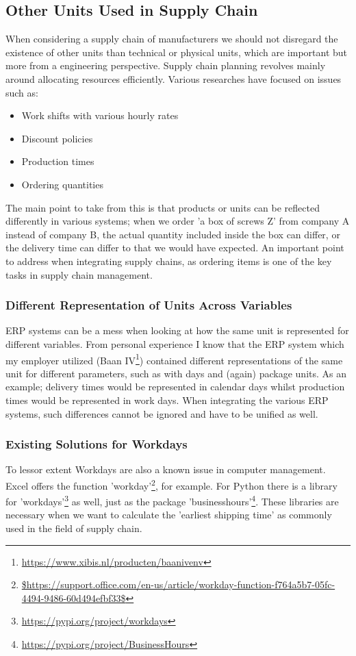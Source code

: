 \documentclass[sigchi, nonacm]{acmart}
\begin{document}
\subsection{Other Units Used in Supply Chain}
When considering a supply chain of manufacturers we should not disregard the existence of other units than technical or physical units, which are important but more from a engineering perspective. Supply chain planning revolves mainly around allocating resources efficiently. Various researches \cite{graves1998dynamic}\cite{sarkar2016supply} have focused on issues such as:
\begin{itemize}
    \item{Work shifts with various hourly rates}
    \item{Discount policies}
    \item{Production times}
    \item{Ordering quantities}
\end{itemize}

The main point to take from this is that products or units can be reflected differently in various systems; when we order 'a box of screws Z' from company A instead of company B, the actual quantity included inside the box can differ, or the delivery time can differ to that we would have expected. An important point to address when integrating supply chains, as ordering items is one of the key tasks in supply chain management.

\subsubsection{Different Representation of Units Across Variables}
ERP systems can be a mess when looking at how the same unit is represented for different variables. From personal experience I know that the ERP system which my employer utilized (Baan IV\footnote{\raggedright\url{https://www.xibis.nl/producten/baanivenv}}) contained different representations of the same unit for different parameters, such as with days and (again) package units. As an example; delivery times would be represented in calendar days whilst production times would be represented in work days. When integrating the various ERP systems, such differences cannot be ignored and have to be unified as well.

\subsubsection{Existing Solutions for Workdays}
To lessor extent Workdays are also a known issue in computer management. Excel offers the function 'workday'\footnote{\raggedright{\url{$https://support.office.com/en-us/article/workday-function-f764a5b7-05fc-4494-9486-60d494efbf33$}}}, for example. For Python there is a library for 'workdays'\footnote{\raggedright{\url{https://pypi.org/project/workdays}}} as well, just as the package 'businesshours'\footnote{\raggedright{\url{https://pypi.org/project/BusinessHours}}}. These libraries are necessary when we want to calculate the 'earliest shipping time' as commonly used in the field of supply chain.
\end{document}
